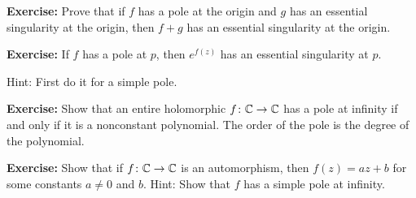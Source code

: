 \documentclass[10pt,aspectratio=169]{beamer}
\begin{document}
\begin{frame}
\textbf{Exercise:}
Prove that if $f$ has a pole at the origin and $g$ has an essential
singularity at the origin, then $f+g$ has an essential singularity at the
origin.

\pause
\medskip

\textbf{Exercise:}
If $f$ has a pole at $p$, then $e^{f(z)}$ has an essential singularity at
$p$.

Hint: First do it for a simple pole.

\pause
\medskip

\textbf{Exercise:}
Show that an entire holomorphic $f \colon {\mathbb{C}} \to {\mathbb{C}}$ has a pole at infinity
if and only if it is a nonconstant polynomial.
The order of the pole is the degree of the polynomial.

\pause
\medskip

\textbf{Exercise:}
Show that if $f \colon {\mathbb{C}} \to {\mathbb{C}}$ is an automorphism, then
$f(z) = az + b$ for
some constants $a \not= 0$ and $b$.  Hint: Show that $f$ has a simple pole at
infinity.
\end{frame}
\end{document}
